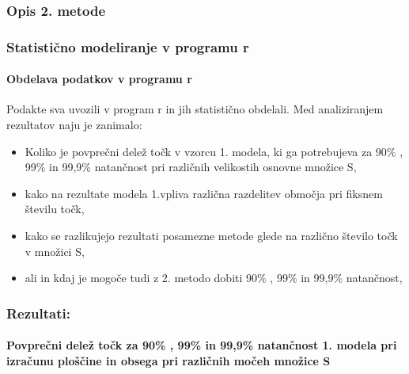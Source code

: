 \documentclass[
]{article}
\providecommand{\tightlist}{%
  \setlength{\itemsep}{0pt}\setlength{\parskip}{0pt}}
\begin{document}
\hypertarget{opis-2.-metode}{%
\subsubsection{Opis 2. metode}\label{opis-2.-metode}}

\hypertarget{statistiux10dno-modeliranje-v-programu-r}{%
\subsubsection{Statistično modeliranje v programu
r}\label{statistiux10dno-modeliranje-v-programu-r}}

\hypertarget{obdelava-podatkov-v-programu-r}{%
\paragraph{Obdelava podatkov v programu
r}\label{obdelava-podatkov-v-programu-r}}

Podakte sva uvozili v program r in jih statistično obdelali. Med
analiziranjem rezultatov naju je zanimalo:

\begin{itemize}
\tightlist
\item
  Koliko je povprečni delež točk v vzorcu 1. modela, ki ga potrebujeva
  za 90\% , 99\% in 99,9\% natančnost pri različnih velikostih osnovne
  množice S,
\item
  kako na rezultate modela 1.vpliva različna razdelitev območja pri
  fiksnem številu točk,
\item
  kako se razlikujejo rezultati posamezne metode glede na različno
  število točk v množici S,
\item
  ali in kdaj je mogoče tudi z 2. metodo dobiti 90\% , 99\% in 99,9\%
  natančnost,
\end{itemize}

\hypertarget{rezultati}{%
\subsubsection{Rezultati:}\label{rezultati}}

\hypertarget{povpreux10dni-deleux17e-toux10dk-za-90-99-in-999-natanux10dnost-1.-modela-pri-izraux10dunu-ploux161ux10dine-in-obsega-pri-razliux10dnih-moux10deh-mnoux17eice-s}{%
\paragraph{Povprečni delež točk za 90\% , 99\% in 99,9\% natančnost 1.
modela pri izračunu ploščine in obsega pri različnih močeh množice
S}\label{povpreux10dni-deleux17e-toux10dk-za-90-99-in-999-natanux10dnost-1.-modela-pri-izraux10dunu-ploux161ux10dine-in-obsega-pri-razliux10dnih-moux10deh-mnoux17eice-s}}
\end{document}
